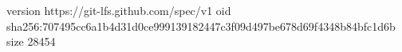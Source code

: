 version https://git-lfs.github.com/spec/v1
oid sha256:707495cc6a1b4d31d0ce999139182447c3f09d497be678d69f4348b84bfc1d6b
size 28454
